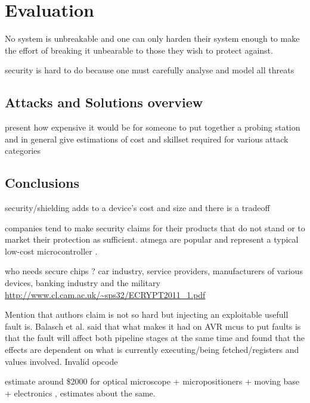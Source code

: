 \section{Evaluation}
\label{sec:conclusion}

No system is unbreakable and one can only harden their system enough to make the effort of breaking it unbearable to those they wish to protect against\citep{anderson:cautionary_note}\cite{sergei:thesis}.

security is hard to do because one must carefully analyse and model all threats \citep{kocher:DPA}
	\subsection{Attacks and Solutions overview}
	present how expensive it would be for someone to put together a probing station and in general give estimations of cost  and skillset required for various attack categories
	\subsection{Conclusions}

security/shielding adds to a device's cost and size \citep{kocher:DPA} and there is a tradeoff \citep{sergei:thesis}


companies tend to make security claims for their products that do not stand or to market their protection as sufficient\citep{sergei:thesis}. atmega are popular and represent a typical low-cost microcontroller \citep{glitches_paper}. 

who needs secure chips ? car industry, service providers, manufacturers of various devices, banking industry and the military \url{http://www.cl.cam.ac.uk/~sps32/ECRYPT2011_1.pdf}

Mention that authors claim is not so hard \citep{sergei:thesis} but injecting an exploitable usefull fault is. Balasch et al. \citep{glitches_paper} said that what makes it had on AVR mcus to put faults is that the fault will affect both pipeline stages at the same time and found that the effects are dependent on what is currently executing/being fetched/registers and values involved. Invalid opcode



\citep{low_cost_probing} estimate around \$2000 for optical microscope + micropositioners + moving base + electronics , \citep{sergei:thesis} estimates about the same. 

